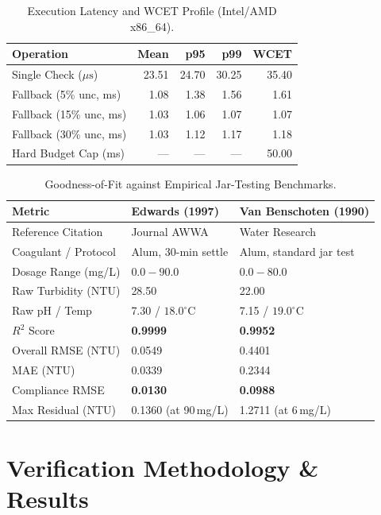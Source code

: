 \documentclass[10pt,twocolumn,letterpaper]{article}
\theoremstyle{definition}
\begin{document}
\begin{table}[t]
\centering
\small
\caption{Execution Latency and WCET Profile (Intel/AMD x86\_64).}
\label{tab:latency}
\begin{tabular}{lrrrr}
\toprule
\textbf{Operation} & \textbf{Mean} & \textbf{p95} & \textbf{p99} & \textbf{WCET} \\
\midrule
Single Check ($\mu\text{s}$) & 23.51 & 24.70 & 30.25 & 35.40 \\
Fallback (5\% unc, ms) & 1.08 & 1.38 & 1.56 & 1.61 \\
Fallback (15\% unc, ms) & 1.03 & 1.06 & 1.07 & 1.07 \\
Fallback (30\% unc, ms) & 1.03 & 1.12 & 1.17 & 1.18 \\
Hard Budget Cap (ms) & --- & --- & --- & 50.00 \\
\bottomrule
\end{tabular}
\end{table}

\begin{table}[t]
\centering
\small
\caption{Goodness-of-Fit against Empirical Jar-Testing Benchmarks.}
\label{tab:jar_tests}
\begin{tabularx}{\columnwidth}{lXX}
\toprule
\textbf{Metric} & \textbf{Edwards (1997)} & \textbf{Van Benschoten (1990)} \\
\midrule
Reference Citation & Journal AWWA~\cite{edwards1997predicting} & Water Research~\cite{vanbenschoten1990chemical} \\
Coagulant / Protocol & Alum, 30-min settle & Alum, standard jar test \\
Dosage Range (mg/L) & $0.0 - 90.0$ & $0.0 - 80.0$ \\
Raw Turbidity (NTU) & 28.50 & 22.00 \\
Raw pH / Temp & 7.30 / $18.0^\circ\text{C}$ & 7.15 / $19.0^\circ\text{C}$ \\
\midrule
$R^2$ Score & \textbf{0.9999} & \textbf{0.9952} \\
Overall RMSE (NTU) & 0.0549 & 0.4401 \\
MAE (NTU) & 0.0339 & 0.2344 \\
Compliance RMSE & \textbf{0.0130} & \textbf{0.0988} \\
Max Residual (NTU) & 0.1360 (at 90\,mg/L) & 1.2711 (at 6\,mg/L) \\
\bottomrule
\end{tabularx}
\end{table}

\section{Verification Methodology \& Results}
\end{document}
